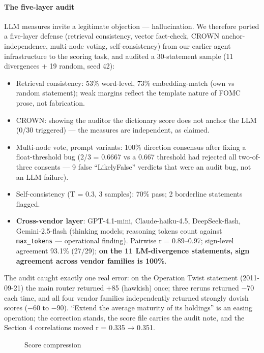 \documentclass[11pt]{article}
\providecommand{\tightlist}{\setlength{\itemsep}{0pt}\setlength{\parskip}{0pt}}
\begin{document}
\paragraph{The five-layer audit}\label{the-five-layer-audit}

LLM measures invite a legitimate objection --- hallucination. We therefore ported a five-layer defense (retrieval consistency, vector fact-check, CROWN anchor-independence, multi-node voting, self-consistency) from our earlier agent infrastructure to the scoring task, and audited a 30-statement sample (11 divergences + 19 random, seed 42):

\begin{itemize}
\tightlist
\item
  Retrieval consistency: 53\% word-level, 73\% embedding-match (own vs random statement); weak margins reflect the template nature of FOMC prose, not fabrication.
\item
  CROWN: showing the auditor the dictionary score does not anchor the LLM (0/30 triggered) --- the measures are independent, as claimed.
\item
  Multi-node vote, prompt variants: 100\% direction consensus after fixing a float-threshold bug (2/3 = 0.6667 vs a 0.667 threshold had rejected all two-of-three consents --- 9 false ``LikelyFalse'' verdicts that were an audit bug, not an LLM failure).
\item
  Self-consistency (T = 0.3, 3 samples): 70\% pass; 2 borderline statements flagged.
\item
  \textbf{Cross-vendor layer}: GPT-4.1-mini, Claude-haiku-4.5, DeepSeek-flash, Gemini-2.5-flash (thinking models; reasoning tokens count against \texttt{max\_tokens} --- operational finding). Pairwise r = 0.89--0.97; sign-level agreement 93.1\% (27/29); \textbf{on the 11 LM-divergence statements, sign agreement across vendor families is 100\%}.
\end{itemize}

The audit caught exactly one real error: on the Operation Twist statement (2011-09-21) the main router returned +85 (hawkish) once; three reruns returned −70 each time, and all four vendor families independently returned strongly dovish scores (−60 to −90). ``Extend the average maturity of its holdings'' is an easing operation; the correction stands, the score file carries the audit note, and the Section 4 correlations moved r = 0.335 → 0.351.

\begin{figure}
\centering
\caption{Score compression}
\end{figure}
\end{document}

